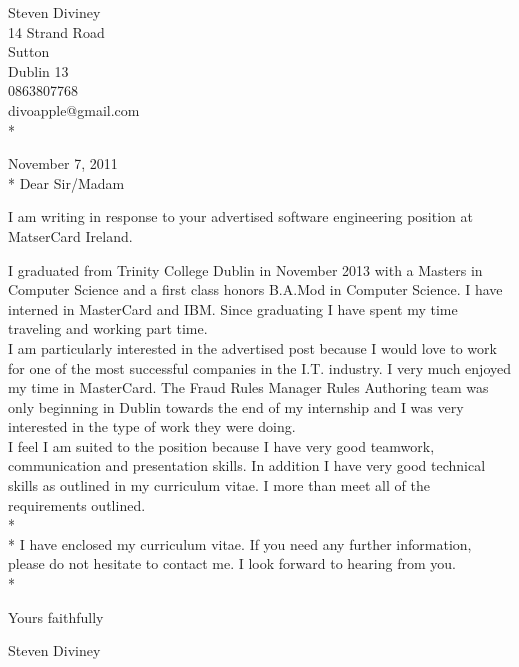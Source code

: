 \documentclass{res}
\begin{document}
 
\begin{resume}

\begin{flushright}
   Steven Diviney \\
   14 Strand Road \\
   Sutton \\
   Dublin 13 \\
   0863807768 \\
   divoapple@gmail.com \\* \vspace{10 mm}
\end{flushright}
\begin{flushleft}
 
November 7, 2011\\*\vspace{10 mm}
Dear Sir/Madam
\end{flushleft}
I am writing in response to your advertised software engineering position at MatserCard Ireland.

I graduated from Trinity College Dublin in November 2013 with a Masters in Computer Science and a first class honors B.A.Mod in Computer Science. I have interned in MasterCard and IBM. Since graduating I have spent my time traveling and working part time.\\

I am particularly interested in the advertised post because I would love to work for one of the most successful companies in the I.T. industry. I very much enjoyed my time in MasterCard. The Fraud Rules Manager Rules Authoring team was only beginning in Dublin towards the end of my internship and I was very interested in the type of work they were doing. \\
I feel I am suited to the position because I have very good teamwork, communication and presentation skills. In addition I have very good technical skills as outlined in my curriculum vitae. I more than meet all of the requirements outlined.
\\*
\\*
I have enclosed my curriculum vitae. If you need any further information, please do not hesitate to contact me. I look forward to hearing from you.\\*

\begin{flushleft}
Yours faithfully\\\vspace{10mm}

Steven Diviney\\
\end{flushleft}

\end{resume}
\end{document}
